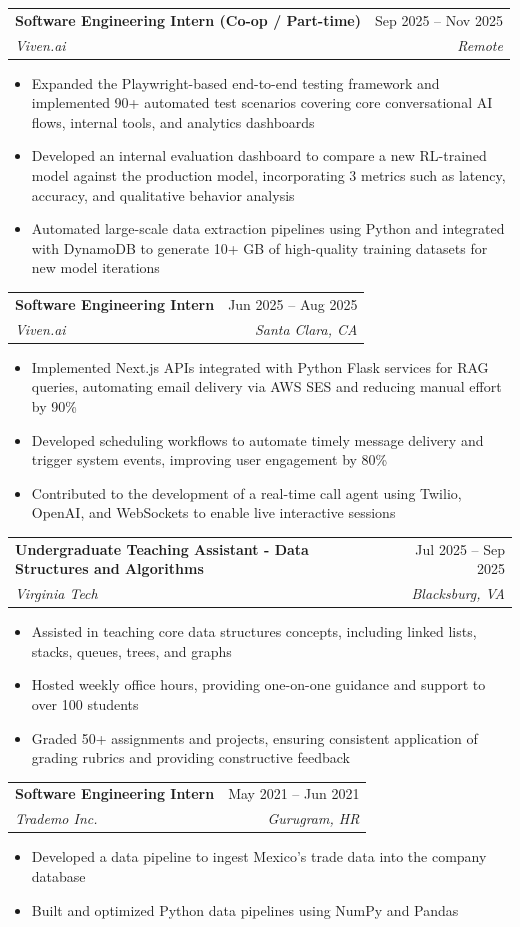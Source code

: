 \documentclass[letterpaper,11pt]{article}
\makeatletter
\newcommand{\resumeItem}[1]{
  \item\small{
    {#1 \vspace{-2pt}}
  }
}
\newcommand{\resumeSubheading}[4]{
  \vspace{-2pt}\item
    \begin{tabular*}{0.97\textwidth}[t]{l@{\extracolsep{\fill}}r}
      \textbf{#1} & #2 \\
      \textit{\small#3} & \textit{\small #4} \\
    \end{tabular*}\vspace{-7pt}
}
\newcommand{\resumeItemListStart}{\begin{itemize}}
\newcommand{\resumeItemListEnd}{\end{itemize}\vspace{-5pt}}
\makeatother
\begin{document}
    \resumeSubheading
      {Software Engineering Intern (Co-op / Part-time)}{Sep 2025 -- Nov 2025}
      {Viven.ai}{Remote}
      \resumeItemListStart
        \resumeItem{Expanded the Playwright-based end-to-end testing framework and implemented 90+ automated test scenarios covering core conversational AI flows, internal tools, and analytics dashboards}
        \resumeItem{Developed an internal evaluation dashboard to compare a new RL-trained model against the production model, incorporating 3 metrics such as latency, accuracy, and qualitative behavior analysis}
        \resumeItem{Automated large-scale data extraction pipelines using Python and integrated with DynamoDB to generate 10+ GB of high-quality training datasets for new model iterations}
      \resumeItemListEnd

       \resumeSubheading
      {Software Engineering Intern}{Jun 2025 -- Aug 2025}
      {Viven.ai}{Santa Clara, CA}
      \resumeItemListStart
        \resumeItem{Implemented Next.js APIs integrated with Python Flask services for RAG queries, automating email delivery via AWS SES and reducing manual effort by 90\%}
        \resumeItem{Developed scheduling workflows to automate timely message delivery and trigger system events, improving user engagement by 80\%}
        \resumeItem{Contributed to the development of a real-time call agent using Twilio, OpenAI, and WebSockets to enable live interactive sessions}
      \resumeItemListEnd

    

    \resumeSubheading
      {Undergraduate Teaching Assistant - Data Structures and Algorithms}{Jul 2025 -- Sep 2025}
      {Virginia Tech}{Blacksburg, VA}
      \resumeItemListStart
        \resumeItem{Assisted in teaching core data structures concepts, including linked lists, stacks, queues, trees, and graphs}
        \resumeItem{Hosted weekly office hours, providing one-on-one guidance and support to over 100 students}
        \resumeItem{Graded 50+ assignments and projects, ensuring consistent application of grading rubrics and providing constructive feedback}
      \resumeItemListEnd

    \resumeSubheading
      {Software Engineering Intern}{May 2021 -- Jun 2021}
      {Trademo Inc.}{Gurugram, HR}
      \resumeItemListStart
        \resumeItem{Developed a data pipeline to ingest Mexico's trade data into the company database}
        \resumeItem{Built and optimized Python data pipelines using NumPy and Pandas}
      \resumeItemListEnd
\end{document}
